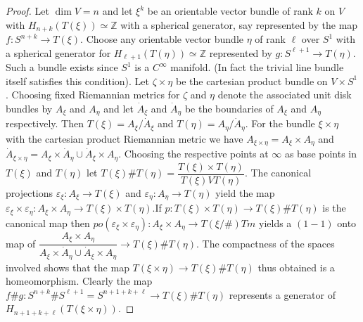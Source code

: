 \begin{proof}
Let $\dim V =n$ and let $\xi^k$ be an orientable vector bundle of rank
$k$ on $V$ with $H_{n+k} (T (\xi)) \simeq \mathbb{Z}$ with a spherical
generator, say represented by the map $f : S^{n+k} \to T
(\xi)$. Choose any orientable vector bundle $\eta$ of rank $\ell$ over
$S^1$ with a spherical generator for $H_{\ell +1} (T (\eta )) \simeq
\mathbb{Z}$ represented by $g : S^{\ell +1} \to T (\eta)$. Such a
bundle exists since $S^1$ is a $C^\infty$ manifold. (In fact the
trivial line bundle itself satisfies this condition). Let $\zeta
\times \eta$ be the cartesian product bundle on $V \times
S^1$. Choosing fixed Riemannian metrics for $\zeta$ and $\eta$ denote
the associated unit disk bundles by $A_\xi$ and $A_\eta$ and let
$\dot{A}_\xi$ and $\dot{A}_\eta$ be the boundaries of $A_\xi$ and $A_\eta$
respectively. Then $T(\xi ) = A_\xi / \dot{A}_\xi$ and $T (\eta) = A_\eta /
\dot{A}_\eta$. For the bundle $\xi \times \eta$ with the cartesian
product Riemannian metric we have $A_{\xi \times \eta} = A_\xi \times
A_ \eta$ and $ \dot{A}_{\xi \times \eta} = A_\xi \times \dot{A}_\eta \cup
\dot{A}_\xi \times A_\eta$. Choosing the respective points at $\infty$ as
base points in $T(\xi)$ and $T (\eta)$ let $T (\xi) \# T(\eta) =
\dfrac{T(\xi) \times T (\eta )}{T (\xi) V T (\eta)}$. The canonical
projections $\varepsilon_\xi : A_\xi \to T(\xi)$ and $\varepsilon_\eta :
A_\eta \to T (\eta)$ yield the map $\varepsilon_\xi \times \varepsilon_\eta
: A _\xi \times A_\eta \to T (\xi) \times T (\eta)$.\pageoriginale If
$p : T (\xi) 
\times T(\eta) \to T (\xi ) \# T (\eta)$ is the canonical map then $po
(\varepsilon_\xi \times \varepsilon_\eta) :  A_\xi \times A_\eta \to T
( \xi / \# ) Tm$ yields a $(1-1)$ onto map of $\dfrac{A_\xi \times
  A_\eta}{A_\xi \times \dot{A}_\eta \cup \dot{A}_\xi \times A_\eta} \to T (\xi) \#
T (\eta)$. The compactness of the spaces involved shows that the map $T
( \xi \times \eta) \to T (\xi ) \# T (\eta)$ thus obtained is a
homeomorphism. Clearly the map $f \# g : S^{n+k} \# S^{\ell +1} =
S^{n+1+k+\ell} \to T (\xi) \# T (\eta )$ represents a generator of
$H_{n+1+k+\ell} (T (\xi \times \eta))$. 
\end{proof}

